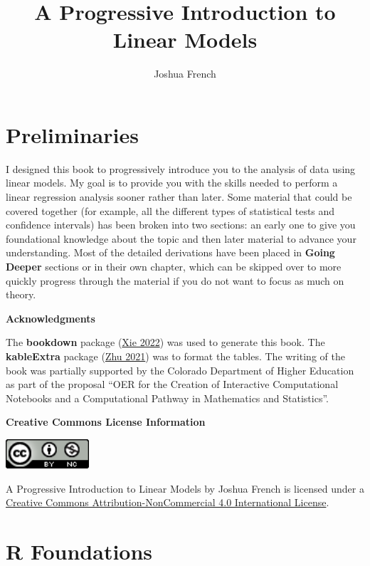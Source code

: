 \documentclass[
]{book}
\title{A Progressive Introduction to Linear Models}
\author{Joshua French}
\date{}
\theoremstyle{definition}
\theoremstyle{definition}
\theoremstyle{definition}
\theoremstyle{definition}
\theoremstyle{remark}
\begin{document}
\maketitle

{
\setcounter{tocdepth}{1}
\tableofcontents
}
\hypertarget{preliminaries}{%
\chapter*{Preliminaries}\label{preliminaries}}

I designed this book to progressively introduce you to the analysis of data using linear models. My goal is to provide you with the skills needed to perform a linear regression analysis sooner rather than later. Some material that could be covered together (for example, all the different types of statistical tests and confidence intervals) has been broken into two sections: an early one to give you foundational knowledge about the topic and then later material to advance your understanding. Most of the detailed derivations have been placed in \textbf{Going Deeper} sections or in their own chapter, which can be skipped over to more quickly progress through the material if you do not want to focus as much on theory.

\textbf{Acknowledgments}

The \textbf{bookdown} package (\protect\hyperlink{ref-R-bookdown}{Xie 2022}) was used to generate this book. The \textbf{kableExtra} package (\protect\hyperlink{ref-R-kableExtra}{Zhu 2021}) was to format the tables. The writing of the book was partially supported by the Colorado Department of Higher Education as part of the proposal ``OER for the Creation of Interactive Computational Notebooks and a Computational Pathway in Mathematics and Statistics''.

\textbf{Creative Commons License Information}

\includegraphics[width=1.22in]{pictures/cc-by-nc}

A Progressive Introduction to Linear Models by Joshua French is licensed under a \href{https://creativecommons.org/licenses/by-nc/4.0/}{Creative Commons Attribution-NonCommercial 4.0 International License}.

\hypertarget{r-foundations}{%
\chapter{R Foundations}\label{r-foundations}}
\end{document}
